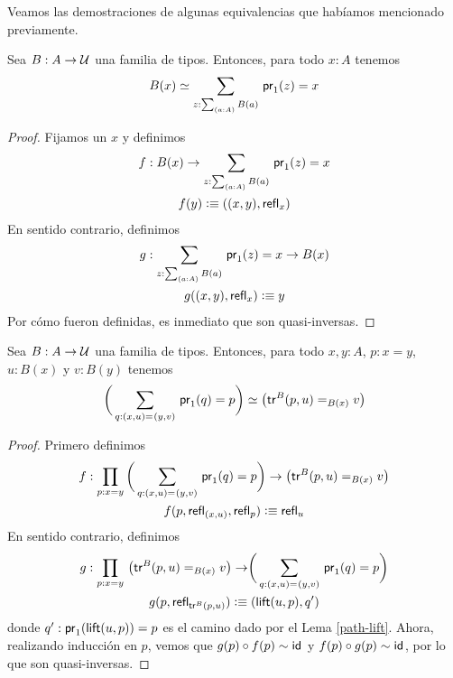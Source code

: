 \documentclass[../main.tex]{subfiles}
\begin{document}
Veamos las demostraciones de algunas equivalencias que hab\'iamos mencionado previamente.

\begin{proposition}\label{fibras-eq}
  Sea $B:A \to \mathcal{U}$ una familia de tipos. Entonces, para todo $x:A$ tenemos
  \[ \eqv{B(x)}{\sm{z: \sm{a:A}B(a)}\fst(z)=x} \]
\end{proposition}
\begin{proof}
  Fijamos un $x$ y definimos
  \begin{gather*}
    f     : B(x) \to \sm{z: \sm{a:A}B(a)}\fst(z)=x \\
    f(y)  \defeq ((x,y), \refl{x})
  \end{gather*}
  En sentido contrario, definimos
  \begin{gather*}
    g                  : \sm{z: \sm{a:A}B(a)}\fst(z)=x \to B(x) \\
    g((x,y), \refl{x}) \defeq y
  \end{gather*}
  Por c\'omo fueron definidas, es inmediato que son quasi-inversas.
\end{proof}

\begin{proposition}\label{paths-over-def}
  Sea $B:A \to \mathcal{U}$ una familia de tipos. Entonces, para todo $x,y:A$, $p:x=y$, $u:B(x)$ y $v:B(y)$ tenemos
  \[ \eqv{\biggr(\sm{q:\id{(x,u)}{(y,v)}}\fst(q)=p\biggr)}{\left(\id[B(x)]{\trfib{B}{p}{u}}{v}\right)} \]
\end{proposition}
\begin{proof}
  Primero definimos
  \begin{gather*}
    f : \prd{p:x=y} \biggr(\sm{q:\id{(x,u)}{(y,v)}}\fst(q)=p\biggr) \to \left(\id[B(x)]{\trfib{B}{p}{u}}{v}\right) \\
    f(p, \refl{(x,u)}, \refl{p}) \defeq \refl{u}
  \end{gather*}
  En sentido contrario, definimos
  \begin{gather*}
    g : \prd{p:x=y} \left(\id[B(x)]{\trfib{B}{p}{u}}{v}\right) \to \biggr(\sm{q:\id{(x,u)}{(y,v)}}\fst(q)=p\biggr) \\
    g(p, \refl{\trfib{B}{p}{u}}) \defeq (\mathsf{lift}(u,p) , q')
  \end{gather*}
  donde $q': \mathsf{pr}_{1}(\mathsf{lift}(u,p))=p$ es el camino dado por el Lema \ref{path-lift}.
  Ahora, realizando inducci\'on en $p$, vemos que $g(p) \circ f(p) \sim \mathsf{id}_{}$ y $f(p) \circ g(p) \sim \mathsf{id}_{}$, por lo que son quasi-inversas.
\end{proof}
\end{document}
